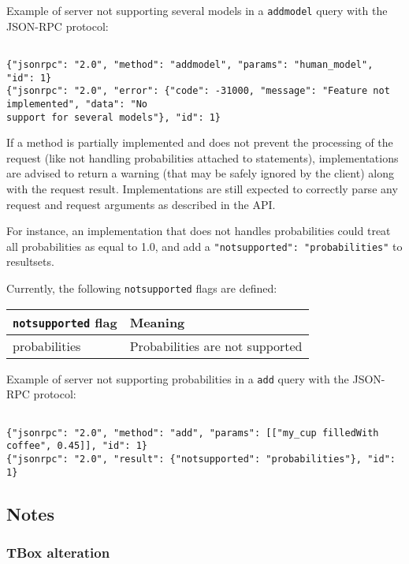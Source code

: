 Example of server not supporting several models in a \texttt{addmodel} query with the JSON-RPC protocol:



\small
\begin{verbatim}

{"jsonrpc": "2.0", "method": "addmodel", "params": "human_model", "id": 1}
{"jsonrpc": "2.0", "error": {"code": -31000, "message": "Feature not implemented", "data": "No
support for several models"}, "id": 1}

\end{verbatim}
\normalsize
If a method is partially implemented and does not prevent the processing of the request (like not handling probabilities attached to statements), implementations are advised to return a warning (that may be safely ignored by the client) along with the request result. Implementations are still expected to correctly parse any request and request arguments as described in the API.

For instance, an implementation that does not handles probabilities could treat all probabilities as equal to 1.0, and add a \texttt{{"notsupported": "probabilities"}} to resultsets.

Currently, the following \texttt{notsupported} flags are defined:

\begin{tabular}{ll}
\hline
\texttt{notsupported} flag & Meaning \\ 
\hline
probabilities & Probabilities are not supported \\ 
\hline
\end{tabular}

Example of server not supporting probabilities in a \texttt{add} query with the JSON-RPC protocol:



\small
\begin{verbatim}

{"jsonrpc": "2.0", "method": "add", "params": [["my_cup filledWith coffee", 0.45]], "id": 1}
{"jsonrpc": "2.0", "result": {"notsupported": "probabilities"}, "id": 1}

\end{verbatim}
\normalsize

\subsection{Notes}
\subsubsection{TBox alteration}

